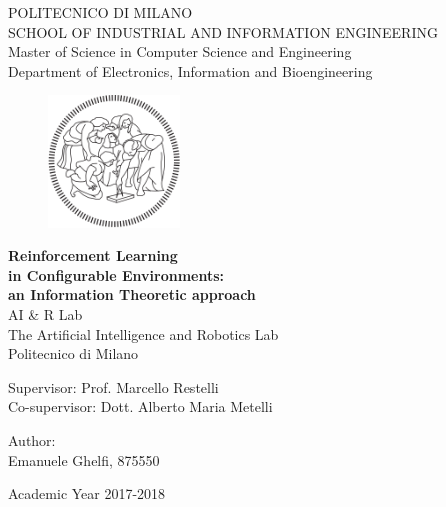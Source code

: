 \thispagestyle{empty}
\vspace*{-1.5cm} \bfseries{
\begin{center}
  \large
  POLITECNICO DI MILANO\\
  \normalsize
  SCHOOL OF INDUSTRIAL AND INFORMATION ENGINEERING \\
  Master of Science in Computer Science and Engineering \\
  Department of Electronics, Information and Bioengineering  
  
  \begin{figure}[htbp]
    \begin{center}
      \includegraphics[width=3.5cm]{./pictures/newlogo.png}
    \end{center}
  \end{figure}
  \vspace*{0.3cm} \LARGE



  \textbf{Reinforcement Learning \\ in Configurable Environments: \\ an Information Theoretic approach}\\



  \vspace*{.75truecm} \large
  AI \& R Lab \\
  The Artificial Intelligence and Robotics Lab \\
  Politecnico di Milano
\end{center}
\vspace*{3.0cm} \large
\begin{flushleft}


  Supervisor: Prof. Marcello Restelli \\
  Co-supervisor: Dott. Alberto Maria Metelli
\end{flushleft}
\vspace*{1.0cm}
\begin{flushright}


  Author:\\ Emanuele Ghelfi, 875550 \\ 


\end{flushright}
\vspace*{0.5cm}
\begin{center}



  Academic Year 2017-2018
\end{center} \clearpage
}
